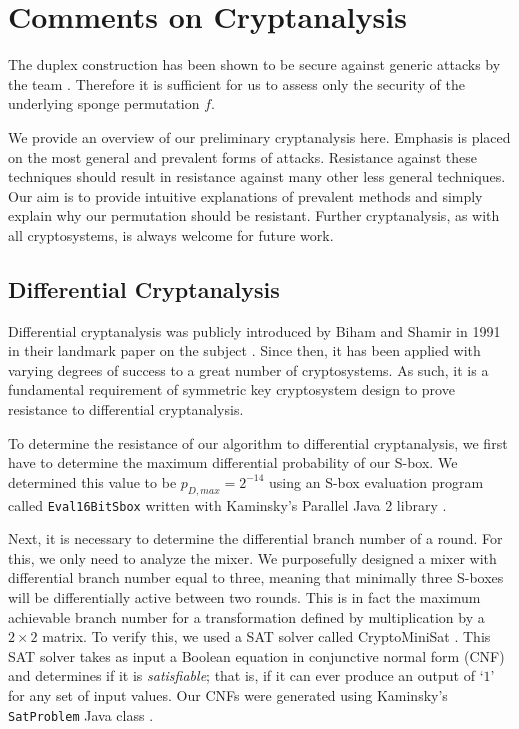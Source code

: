 \section{Comments on Cryptanalysis}
\label{sec:Cryptanalysis}
The duplex construction has been shown to be secure against generic attacks by the \Keccak team \cite{Bertoni2011_SpongeFunctions}.
Therefore it is sufficient for us to assess only the security of the underlying sponge permutation $f$.

We provide an overview of our preliminary cryptanalysis here.
Emphasis is placed on the most general and prevalent forms of attacks.
Resistance against these techniques should result in resistance against many other less general techniques.
Our aim is to provide intuitive explanations of prevalent methods and simply explain why our permutation should be resistant.
Further cryptanalysis, as with all cryptosystems, is always welcome for future work.

\subsection{Differential Cryptanalysis}
Differential cryptanalysis was publicly introduced by Biham and Shamir in 1991 in their landmark paper on the subject \cite{Biham1991_Differential}.
Since then, it has been applied with varying degrees of success to a great number of cryptosystems.
As such, it is a fundamental requirement of symmetric key cryptosystem design to prove resistance to differential cryptanalysis.

To determine the resistance of our algorithm to differential cryptanalysis, we first have to determine the maximum differential probability of our S-box.
We determined this value to be $p_{D,max} = 2^{-14}$ using an S-box evaluation program called \texttt{Eval16BitSbox} \cite{Kaminsky2014_BlockCipherAnalysis} written with Kaminsky's Parallel Java 2 library \cite{Kaminsky2014_PJ2}.

Next, it is necessary to determine the differential branch number of a round.
For this, we only need to analyze the mixer. 
We purposefully designed a mixer with differential branch number equal to three, meaning that minimally three S-boxes will be differentially active between two rounds.
This is in fact the maximum achievable branch number for a transformation defined by multiplication by a $2 \times 2$ matrix.
To verify this, we used a SAT solver called CryptoMiniSat \cite{Soos2014_CryptoMiniSat}.
This SAT solver takes as input a Boolean equation in conjunctive normal form (CNF) and determines if it is \emph{satisfiable}; that is, if it can ever produce an output of `$1$' for any set of input values.
Our CNFs were generated using Kaminsky's \texttt{SatProblem} Java class \cite{Kaminsky2014_BlockCipherAnalysis}.


